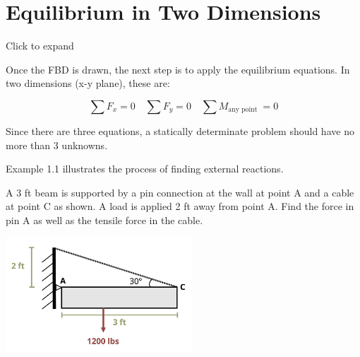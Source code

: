 \documentclass[
  letterpaper,
  DIV=11,
  numbers=noendperiod]{scrreprt}
\begin{document}
\section{Equilibrium in Two Dimensions}\label{sec-1.1}

Click to expand

Once the FBD is drawn, the next step is to apply the equilibrium
equations. In two dimensions (x-y plane), these are:

\[
\sum F_x=0 \quad \sum F_y=0 \quad \sum M_{\text {any point }}=0
\]

Since there are three equations, a statically determinate problem should
have no more than 3 unknowns.

Example 1.1 illustrates the process of finding external reactions.

\begin{tcolorbox}[enhanced jigsaw, breakable, opacityback=0, toptitle=1mm, left=2mm, colback=white, opacitybacktitle=0.6, colframe=quarto-callout-tip-color-frame, titlerule=0mm, arc=.35mm, leftrule=.75mm, bottomtitle=1mm, colbacktitle=quarto-callout-tip-color!10!white, rightrule=.15mm, title={Example 1.1}, bottomrule=.15mm, toprule=.15mm, coltitle=black]

A 3 ft beam is supported by a pin connection at the wall at point A and
a cable at point C as shown. A load is applied 2 ft away from point A.
Find the force in pin A as well as the tensile force in the cable.

\begin{center}
\includegraphics[width=2.75in,height=\textheight]{images/CH1 PNGs/example 1.1 part 1.png}
\end{center}

\begin{tcolorbox}[enhanced jigsaw, breakable, opacityback=0, toptitle=1mm, left=2mm, colback=white, opacitybacktitle=0.6, colframe=quarto-callout-tip-color-frame, titlerule=0mm, arc=.35mm, leftrule=.75mm, bottomtitle=1mm, colbacktitle=quarto-callout-tip-color!10!white, rightrule=.15mm, title={Solution}, bottomrule=.15mm, toprule=.15mm, coltitle=black]


\end{tcolorbox}
\end{tcolorbox}
\end{document}
